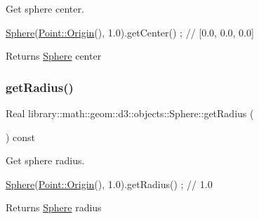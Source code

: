 Get sphere center. 


\begin{DoxyCode}
\hyperlink{classlibrary_1_1math_1_1geom_1_1d3_1_1objects_1_1_sphere_a55dccc8ea16ee55cd7694c26afa8ea39}{Sphere}(\hyperlink{classlibrary_1_1math_1_1geom_1_1d3_1_1objects_1_1_point_ab2a38e285c562e50bf350272c083986f}{Point::Origin}(), 1.0).getCenter() ; \textcolor{comment}{// [0.0, 0.0, 0.0]}
\end{DoxyCode}


\begin{DoxyReturn}{Returns}
\hyperlink{classlibrary_1_1math_1_1geom_1_1d3_1_1objects_1_1_sphere}{Sphere} center 
\end{DoxyReturn}
\mbox{\label{classlibrary_1_1math_1_1geom_1_1d3_1_1objects_1_1_sphere_a48cfc72b6eec9a953fb837a13e1df45e}} 
\subsubsection{\texorpdfstring{get\+Radius()}{getRadius()}}
{\footnotesize\ttfamily Real library\+::math\+::geom\+::d3\+::objects\+::\+Sphere\+::get\+Radius (\begin{DoxyParamCaption}{ }\end{DoxyParamCaption}) const}



Get sphere radius. 


\begin{DoxyCode}
\hyperlink{classlibrary_1_1math_1_1geom_1_1d3_1_1objects_1_1_sphere_a55dccc8ea16ee55cd7694c26afa8ea39}{Sphere}(\hyperlink{classlibrary_1_1math_1_1geom_1_1d3_1_1objects_1_1_point_ab2a38e285c562e50bf350272c083986f}{Point::Origin}(), 1.0).getRadius() ; \textcolor{comment}{// 1.0}
\end{DoxyCode}


\begin{DoxyReturn}{Returns}
\hyperlink{classlibrary_1_1math_1_1geom_1_1d3_1_1objects_1_1_sphere}{Sphere} radius 
\end{DoxyReturn}
\mbox{\label{classlibrary_1_1math_1_1geom_1_1d3_1_1objects_1_1_sphere_a6cee64ab56c136802a08d7b5403b80ac}} 
